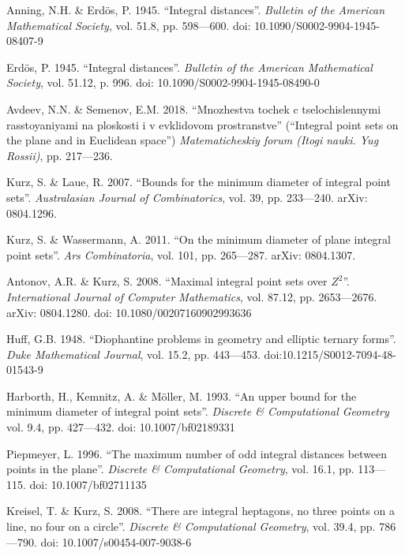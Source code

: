 \begin{engbibliography}{99}

	Anning, N.H. \& Erdös, P. 1945.
	“Integral distances”.
	\emph{Bulletin of the American Mathematical Society}, vol. 51.8, pp. 598—600.
	doi: 10.1090/S0002-9904-1945-08407-9

	Erdös, P. 1945.
	“Integral distances”.
	\emph{Bulletin of the American Mathematical Society}, vol. 51.12, p. 996.
	doi: 10.1090/S0002-9904-1945-08490-0

	Avdeev, N.N. \& Semenov, E.M. 2018.
	``Mnozhestva tochek c tselochislennymi rasstoyaniyami na ploskosti i v evklidovom prostranstve''
	(``Integral point sets on the plane and in Euclidean space'')
	\emph{Matematicheskiy forum (Itogi nauki. Yug Rossii)}, pp. 217—236.

	Kurz, S. \& Laue, R. 2007.
	“Bounds for the minimum diameter of integral point sets”.
	\emph{Australasian Journal of Combinatorics}, vol. 39, pp. 233—240. arXiv: 0804.1296.

	Kurz, S. \& Wassermann, A. 2011.
	“On the minimum diameter of plane integral point sets”.
	\emph{Ars Combinatoria}, vol. 101, pp. 265—287. arXiv: 0804.1307.

	Antonov, A.R. \& Kurz, S. 2008.
	“Maximal integral point sets over $Z^2$”.
	\emph{International Journal of Computer Mathematics}, vol. 87.12, pp. 2653—2676. arXiv: 0804.1280.
	doi: 10.1080/00207160902993636

	Huff, G.B. 1948.
	“Diophantine problems in geometry and elliptic ternary forms”.
	\emph{Duke Mathematical Journal}, vol. 15.2, pp. 443—453.
	doi:10.1215/S0012-7094-48-01543-9

	Harborth, H., Kemnitz, A. \& Möller, M. 1993.
	“An upper bound for the minimum diameter of integral point sets”.
	\emph{Discrete \& Computational Geometry} vol. 9.4, pp. 427—432.
	doi: 10.1007/bf02189331

	Piepmeyer, L. 1996.
	“The maximum number of odd integral distances between points in the plane”.
	\emph{Discrete \& Computational Geometry}, vol. 16.1, pp. 113—115.
	doi: 10.1007/bf02711135

	Kreisel, T. \& Kurz, S. 2008.
	“There are integral heptagons, no three points on a line, no four on a circle”.
	\emph{Discrete \& Computational Geometry}, vol. 39.4, pp. 786—790.
	doi: 10.1007/s00454-007-9038-6


\end{engbibliography}
